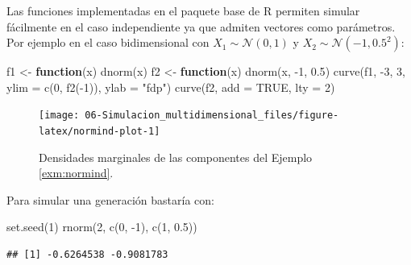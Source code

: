 \documentclass[
]{book}
\newenvironment{Shaded}{\begin{snugshade}}{\end{snugshade}}
\newcommand{\AttributeTok}[1]{\textcolor[rgb]{0.77,0.63,0.00}{#1}}
\newcommand{\ConstantTok}[1]{\textcolor[rgb]{0.00,0.00,0.00}{#1}}
\newcommand{\ControlFlowTok}[1]{\textcolor[rgb]{0.13,0.29,0.53}{\textbf{#1}}}
\newcommand{\DecValTok}[1]{\textcolor[rgb]{0.00,0.00,0.81}{#1}}
\newcommand{\FloatTok}[1]{\textcolor[rgb]{0.00,0.00,0.81}{#1}}
\newcommand{\FunctionTok}[1]{\textcolor[rgb]{0.00,0.00,0.00}{#1}}
\newcommand{\NormalTok}[1]{#1}
\newcommand{\OtherTok}[1]{\textcolor[rgb]{0.56,0.35,0.01}{#1}}
\newcommand{\SpecialCharTok}[1]{\textcolor[rgb]{0.00,0.00,0.00}{#1}}
\newcommand{\StringTok}[1]{\textcolor[rgb]{0.31,0.60,0.02}{#1}}
\theoremstyle{break}
\theoremstyle{nonumberplain}
\begin{document}
Las funciones implementadas en el paquete base de R permiten simular fácilmente en el caso independiente ya que admiten vectores como parámetros.
Por ejemplo en el caso bidimensional con \(X_1 \sim \mathcal{N}\left( 0, 1\right)\) y \(X_2 \sim \mathcal{N}\left( -1, 0.5^2 \right)\):



\begin{Shaded}
\begin{Highlighting}[]
\NormalTok{f1 }\OtherTok{\textless{}{-}} \ControlFlowTok{function}\NormalTok{(x) }\FunctionTok{dnorm}\NormalTok{(x)}
\NormalTok{f2 }\OtherTok{\textless{}{-}} \ControlFlowTok{function}\NormalTok{(x) }\FunctionTok{dnorm}\NormalTok{(x, }\SpecialCharTok{{-}}\DecValTok{1}\NormalTok{, }\FloatTok{0.5}\NormalTok{)}
\FunctionTok{curve}\NormalTok{(f1, }\SpecialCharTok{{-}}\DecValTok{3}\NormalTok{, }\DecValTok{3}\NormalTok{, }\AttributeTok{ylim =} \FunctionTok{c}\NormalTok{(}\DecValTok{0}\NormalTok{, }\FunctionTok{f2}\NormalTok{(}\SpecialCharTok{{-}}\DecValTok{1}\NormalTok{)), }\AttributeTok{ylab =} \StringTok{"fdp"}\NormalTok{)}
\FunctionTok{curve}\NormalTok{(f2, }\AttributeTok{add =} \ConstantTok{TRUE}\NormalTok{, }\AttributeTok{lty =} \DecValTok{2}\NormalTok{)}
\end{Highlighting}
\end{Shaded}

\begin{figure}[!htb]

{\centering \texttt{[image: 06-Simulacion\_multidimensional\_files/figure-latex/normind-plot-1]} 

}

\caption{Densidades marginales de las componentes del Ejemplo \ref{exm:normind}.}\label{fig:normind-plot}
\end{figure}

Para simular una generación bastaría con:

\begin{Shaded}
\begin{Highlighting}[]
\FunctionTok{set.seed}\NormalTok{(}\DecValTok{1}\NormalTok{)}
\FunctionTok{rnorm}\NormalTok{(}\DecValTok{2}\NormalTok{, }\FunctionTok{c}\NormalTok{(}\DecValTok{0}\NormalTok{, }\SpecialCharTok{{-}}\DecValTok{1}\NormalTok{), }\FunctionTok{c}\NormalTok{(}\DecValTok{1}\NormalTok{, }\FloatTok{0.5}\NormalTok{))}
\end{Highlighting}
\end{Shaded}

\begin{verbatim}
## [1] -0.6264538 -0.9081783
\end{verbatim}
\end{document}
